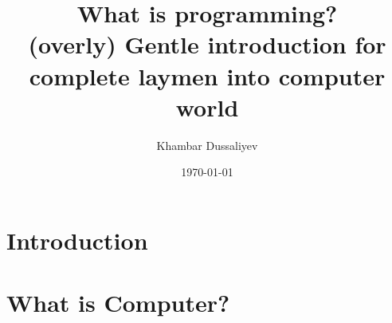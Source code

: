 \documentclass{report}
\title{
    What is programming? \\
    \large (overly) Gentle introduction for complete laymen into computer world
}
\author{Khambar Dussaliyev}
\date{\today}
\begin{document}
    \maketitle
    

    \newpage

    \tableofcontents

    \chapter{Introduction}

        
        \newpage

    \chapter{What is Computer?}
        
\end{document}
